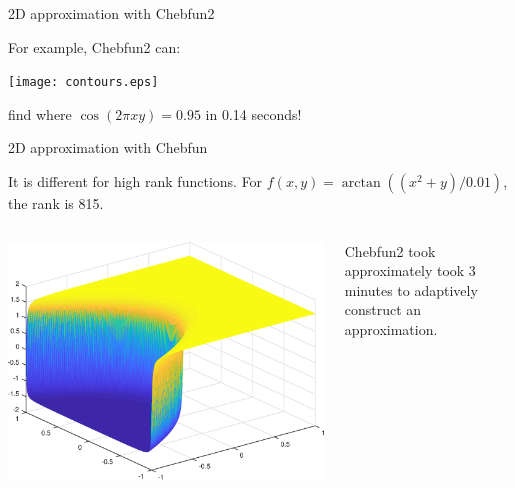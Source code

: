 \documentclass{beamer}
\newcommand{\lp}{\left(}
\newcommand{\rp}{\right)}
\begin{document}
\begin{frame}{2D approximation with Chebfun2}
	\begin{center}
	For example, Chebfun2 can:
	\end{center}

\begin{center}
\texttt{[image: contours.eps]}
\end{center}

\begin{center}
find where $\cos(2 \pi x y) = 0.95$ in 0.14 seconds!
\end{center}

\end{frame}

\begin{frame}{2D approximation with Chebfun}

\begin{center}
It is different for high rank functions. For $f(x,y) = \arctan \lp \lp x^2+y \rp/0.01 \rp$, the rank is 815.
\end{center}
\begin{columns}

\begin{column}{0.5\textwidth}	
\begin{center}
\includegraphics[scale = 0.3]{tan2Dplot.eps}	
\end{center}
\end{column}

\begin{column}{0.5\textwidth}
Chebfun2 took approximately took 3 minutes to adaptively construct an approximation.
\end{column}

\end{columns}

\end{frame}
\end{document}
